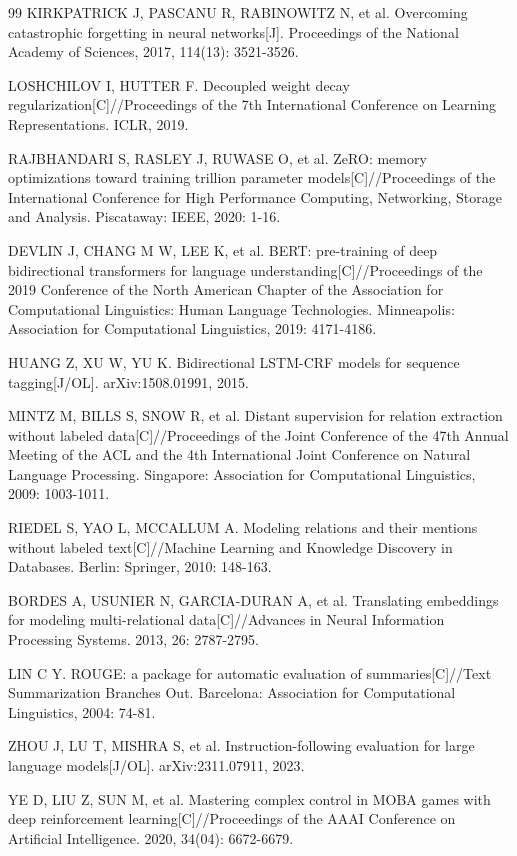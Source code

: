 \documentclass[fontset=fandol,type=master,campus=shenzhen,etitleauto=true]{hithesisbook}
\begin{document}
\begin{thebibliography}{99}
 KIRKPATRICK J, PASCANU R, RABINOWITZ N, et al. Overcoming catastrophic forgetting in neural networks[J]. Proceedings of the National Academy of Sciences, 2017, 114(13): 3521-3526.

 LOSHCHILOV I, HUTTER F. Decoupled weight decay regularization[C]//Proceedings of the 7th International Conference on Learning Representations. ICLR, 2019.

 RAJBHANDARI S, RASLEY J, RUWASE O, et al. ZeRO: memory optimizations toward training trillion parameter models[C]//Proceedings of the International Conference for High Performance Computing, Networking, Storage and Analysis. Piscataway: IEEE, 2020: 1-16.

 DEVLIN J, CHANG M W, LEE K, et al. BERT: pre-training of deep bidirectional transformers for language understanding[C]//Proceedings of the 2019 Conference of the North American Chapter of the Association for Computational Linguistics: Human Language Technologies. Minneapolis: Association for Computational Linguistics, 2019: 4171-4186.

 HUANG Z, XU W, YU K. Bidirectional LSTM-CRF models for sequence tagging[J/OL]. arXiv:1508.01991, 2015.

 MINTZ M, BILLS S, SNOW R, et al. Distant supervision for relation extraction without labeled data[C]//Proceedings of the Joint Conference of the 47th Annual Meeting of the ACL and the 4th International Joint Conference on Natural Language Processing. Singapore: Association for Computational Linguistics, 2009: 1003-1011.

 RIEDEL S, YAO L, MCCALLUM A. Modeling relations and their mentions without labeled text[C]//Machine Learning and Knowledge Discovery in Databases. Berlin: Springer, 2010: 148-163.

 BORDES A, USUNIER N, GARCIA-DURAN A, et al. Translating embeddings for modeling multi-relational data[C]//Advances in Neural Information Processing Systems. 2013, 26: 2787-2795.

 LIN C Y. ROUGE: a package for automatic evaluation of summaries[C]//Text Summarization Branches Out. Barcelona: Association for Computational Linguistics, 2004: 74-81.

 ZHOU J, LU T, MISHRA S, et al. Instruction-following evaluation for large language models[J/OL]. arXiv:2311.07911, 2023.

 YE D, LIU Z, SUN M, et al. Mastering complex control in MOBA games with deep reinforcement learning[C]//Proceedings of the AAAI Conference on Artificial Intelligence. 2020, 34(04): 6672-6679.


\end{thebibliography}
\end{document}
